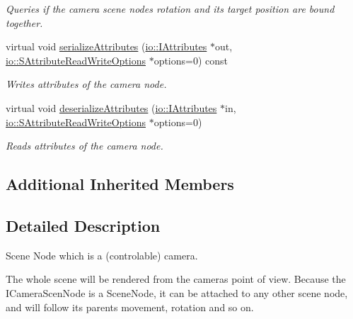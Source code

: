 \begin{DoxyCompactItemize}
\begin{DoxyCompactList}\small\item\em Queries if the camera scene node\textquotesingle{}s rotation and its target position are bound together. \end{DoxyCompactList}\item 
\mbox{\label{classirr_1_1scene_1_1ICameraSceneNode_a0a78a29638be1665ee5dba22c2c3b846}} 
virtual void \hyperlink{classirr_1_1scene_1_1ICameraSceneNode_a0a78a29638be1665ee5dba22c2c3b846}{serialize\+Attributes} (\hyperlink{classirr_1_1io_1_1IAttributes}{io\+::\+I\+Attributes} $\ast$out, \hyperlink{structirr_1_1io_1_1SAttributeReadWriteOptions}{io\+::\+S\+Attribute\+Read\+Write\+Options} $\ast$options=0) const
\begin{DoxyCompactList}\small\item\em Writes attributes of the camera node. \end{DoxyCompactList}\item 
\mbox{\label{classirr_1_1scene_1_1ICameraSceneNode_a0df881cb5e2a55562399281061151ae8}} 
virtual void \hyperlink{classirr_1_1scene_1_1ICameraSceneNode_a0df881cb5e2a55562399281061151ae8}{deserialize\+Attributes} (\hyperlink{classirr_1_1io_1_1IAttributes}{io\+::\+I\+Attributes} $\ast$in, \hyperlink{structirr_1_1io_1_1SAttributeReadWriteOptions}{io\+::\+S\+Attribute\+Read\+Write\+Options} $\ast$options=0)
\begin{DoxyCompactList}\small\item\em Reads attributes of the camera node. \end{DoxyCompactList}\end{DoxyCompactItemize}
\subsection*{Additional Inherited Members}


\subsection{Detailed Description}
Scene Node which is a (controlable) camera. 

The whole scene will be rendered from the cameras point of view. Because the I\+Camera\+Scen\+Node is a Scene\+Node, it can be attached to any other scene node, and will follow its parents movement, rotation and so on. 


